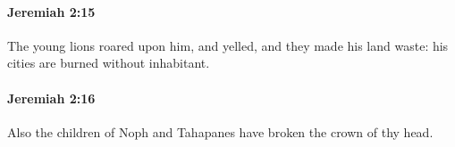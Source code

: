 		\paragraph{Jeremiah 2:15} %
			\label{JEREMIAH-2-15}

			The young lions roared upon him, and yelled, and they made his land waste: his cities are burned without inhabitant.


		\paragraph{Jeremiah 2:16} %
			\label{JEREMIAH-2-16}

			Also the children of Noph and Tahapanes have broken the crown of thy head.


